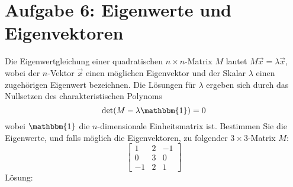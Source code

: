 \section*{Aufgabe 6: Eigenwerte und Eigenvektoren}
Die Eigenwertgleichung einer quadratischen $n\times n$-Matrix $M$ lautet $M\overrightarrow{x}=\lambda\overrightarrow{x}$, wobei der $n$-Vektor $\overrightarrow{x}$ einen möglichen Eigenvektor und der Skalar $\lambda$ einen zugehörigen Eigenwert bezeichnen. Die Lösungen für $\lambda$ ergeben sich durch das Nullsetzen des charakteristischen Polynoms
\[\det(M-\lambda\mathbbm{1})=0\]
wobei $\mathbbm{1}$ die $n$-dimensionale Einheitsmatrix ist.  Bestimmen Sie die Eigenwerte, und falls möglich die Eigenvektoren, zu folgender $3\times 3$-Matrix $M$:
\[\begin{bmatrix}
	1 & 2& -1\\
	0 & 3 & 0\\
	-1 & 2 & 1
\end{bmatrix}\]
Lösung:
